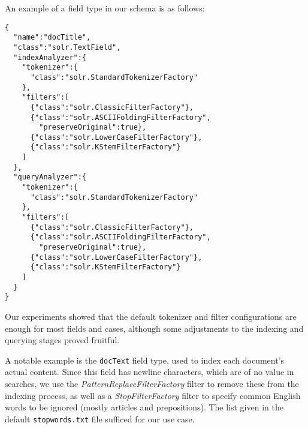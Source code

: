 \documentclass[sigconf, authorversion]{acmart}
\begin{document}
An example of a field type in our schema is as follows:

\begin{lstlisting}
{
  "name":"docTitle",
  "class":"solr.TextField",
  "indexAnalyzer":{
    "tokenizer":{
      "class":"solr.StandardTokenizerFactory"
    },
    "filters":[
      {"class":"solr.ClassicFilterFactory"},
      {"class":"solr.ASCIIFoldingFilterFactory",
        "preserveOriginal":true},
      {"class":"solr.LowerCaseFilterFactory"},
      {"class":"solr.KStemFilterFactory"}
    ]
  },
  "queryAnalyzer":{
    "tokenizer":{
      "class":"solr.StandardTokenizerFactory"
    },
    "filters":[
      {"class":"solr.ClassicFilterFactory"},
      {"class":"solr.ASCIIFoldingFilterFactory",
        "preserveOriginal":true},
      {"class":"solr.LowerCaseFilterFactory"},
      {"class":"solr.KStemFilterFactory"}
    ]
  }
}
\end{lstlisting}


Our experiments showed that the default tokenizer and filter configurations are enough for most fields and cases, although some adjustments to the indexing and querying stages proved fruitful. 

A notable example is the \texttt{docText} field type, used to index each document's actual content.
Since this field has newline characters, which are of no value in searches, we use the \textit{PatternReplaceFilterFactory} filter to remove these from the indexing process, as well as a \textit{StopFilterFactory} filter to specify common English words to be ignored (mostly articles and prepositions). The list given in the default \texttt{stopwords.txt} file sufficed for our use case.
\end{document}
